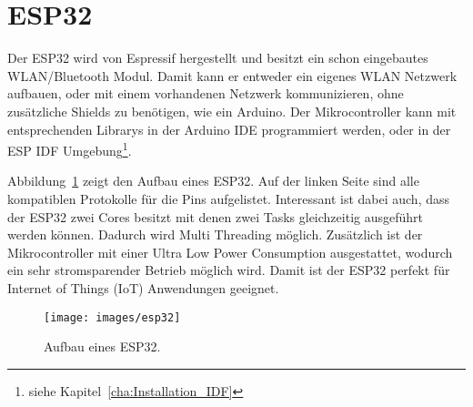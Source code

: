 \section{ESP32}
Der ESP32 wird von Espressif hergestellt und besitzt ein schon eingebautes WLAN/Bluetooth Modul. Damit kann er entweder ein eigenes WLAN Netzwerk aufbauen, oder mit einem vorhandenen Netzwerk kommunizieren, ohne zusätzliche Shields zu benötigen, wie ein Arduino. Der Mikrocontroller kann mit entsprechenden Librarys in der Arduino IDE programmiert werden, oder in der ESP IDF Umgebung\footnote{siehe Kapitel~\ref{cha:Installation_IDF}}.

Abbildung~\ref{fig:esp32} zeigt den Aufbau eines ESP32. Auf der linken Seite sind alle kompatiblen Protokolle für die Pins aufgelistet. Interessant ist dabei auch, dass der ESP32 zwei Cores besitzt mit denen zwei Tasks gleichzeitig ausgeführt werden können. Dadurch wird Multi Threading möglich. Zusätzlich ist der Mikrocontroller mit einer Ultra Low Power Consumption ausgestattet, wodurch ein sehr stromsparender Betrieb möglich wird. Damit ist der ESP32 perfekt für Internet of Things (IoT) Anwendungen geeignet.

\begin{figure}[hbt]
	\centering
	\texttt{[image: images/esp32]}
	\caption[ESP32 Aufbau]{Aufbau eines ESP32.}
	\label{fig:esp32}
\end{figure}

